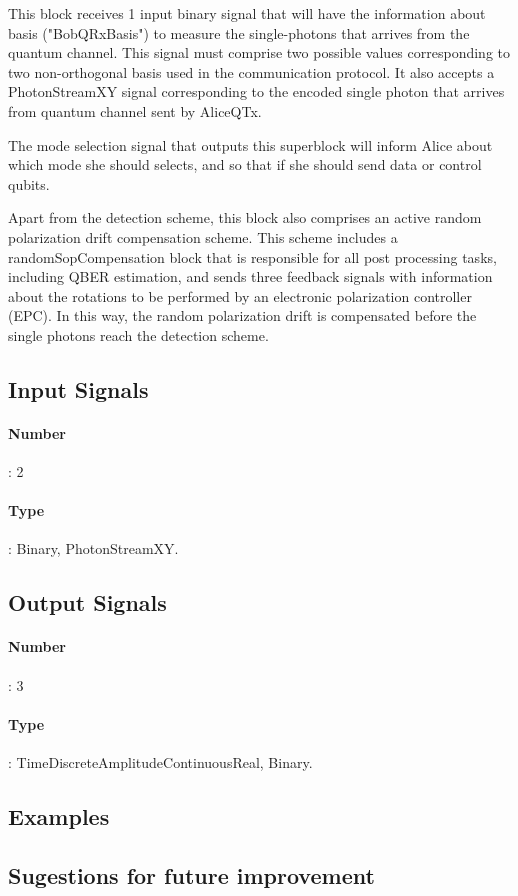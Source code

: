 This block receives 1 input binary signal that will have the information about basis ("BobQRxBasis") to measure the single-photons that arrives from the quantum channel. This signal must comprise two possible values corresponding to two non-orthogonal basis used in the communication protocol. It also accepts a PhotonStreamXY signal corresponding to the encoded single photon that arrives from quantum channel sent by AliceQTx.

The mode selection signal that outputs this superblock will inform Alice about which mode she should selects, and so that if she should send data or control qubits.

Apart from the detection scheme, this block also comprises an active random polarization drift compensation scheme. This scheme includes a randomSopCompensation block that is responsible for all post processing tasks, including QBER estimation, and sends three feedback signals with information about the rotations to be performed by an electronic polarization controller (EPC). In this way, the random polarization drift is compensated before the single photons reach the detection scheme.


\subsection*{Input Signals}
\paragraph*{Number}: 2
\paragraph*{Type}: Binary, PhotonStreamXY.

\subsection*{Output Signals}
\paragraph*{Number}: 3
\paragraph*{Type}: TimeDiscreteAmplitudeContinuousReal, Binary.

\subsection*{Examples}


\subsection*{Sugestions for future improvement}



